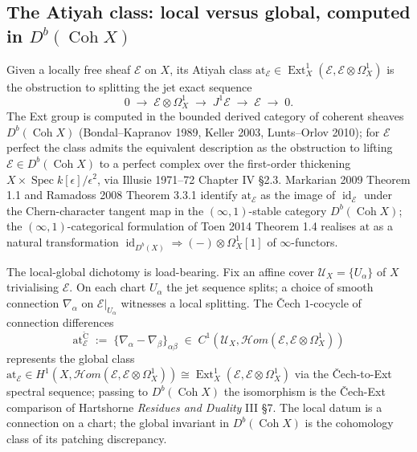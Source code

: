 \documentclass[11pt,reqno]{amsart}
\theoremstyle{plain}
\theoremstyle{definition}
\theoremstyle{remark}
\DeclareMathOperator{\Ext}{Ext}
\DeclareMathOperator{\Coh}{Coh}
\DeclareMathOperator{\id}{id}
\DeclareMathOperator{\Spec}{Spec}
\newcommand{\cU}{\mathcal{U}}
\newcommand{\cE}{\mathcal{E}}
\newcommand{\at}{\mathrm{at}}
\begin{document}
\subsection{The Atiyah class: local versus global, computed in $D^b(\Coh X)$}
\label{subsec:atiyah-local-global}
Given a locally free sheaf $\cE$ on $X$, its Atiyah class $\at_\cE \in \Ext^1_X(\cE, \cE \otimes \Omega^1_X)$ is the obstruction to splitting the jet exact sequence
\[
  0 \;\longrightarrow\; \cE \otimes \Omega^1_X \;\longrightarrow\; J^1 \cE \;\longrightarrow\; \cE \;\longrightarrow\; 0.
\]
The Ext group is computed in the bounded derived category of coherent sheaves $D^b(\Coh X)$ (Bondal--Kapranov 1989, Keller 2003, Lunts--Orlov 2010); for $\cE$ perfect the class admits the equivalent description as the obstruction to lifting $\cE \in D^b(\Coh X)$ to a perfect complex over the first-order thickening $X \times \Spec k[\epsilon]/\epsilon^2$, via Illusie 1971--72 Chapter IV \S2.3. Markarian 2009 Theorem 1.1 and Ramadoss 2008 Theorem 3.3.1 identify $\at_\cE$ as the image of $\id_\cE$ under the Chern-character tangent map in the $(\infty,1)$-stable category $D^b(\Coh X)$; the $(\infty,1)$-categorical formulation of Toen 2014 Theorem 1.4 realises $\at$ as a natural transformation $\id_{D^b(X)} \Rightarrow (-) \otimes \Omega^1_X[1]$ of $\infty$-functors.

The local-global dichotomy is load-bearing. Fix an affine cover $\cU_X = \{U_\alpha\}$ of $X$ trivialising $\cE$. On each chart $U_\alpha$ the jet sequence splits; a choice of smooth connection $\nabla_\alpha$ on $\cE|_{U_\alpha}$ witnesses a local splitting. The Čech $1$-cocycle of connection differences
\[
  \at_\cE^{\check{\mathrm C}} \;:=\; \{\nabla_\alpha - \nabla_\beta\}_{\alpha\beta} \;\in\; C^1(\cU_X, \mathcal{H}om(\cE, \cE \otimes \Omega^1_X))
\]
represents the global class $\at_\cE \in H^1(X, \mathcal{H}om(\cE, \cE \otimes \Omega^1_X)) \cong \Ext^1_X(\cE, \cE \otimes \Omega^1_X)$ via the Čech-to-Ext spectral sequence; passing to $D^b(\Coh X)$ the isomorphism is the Čech-Ext comparison of Hartshorne \emph{Residues and Duality} III \S7. The local datum is a connection on a chart; the global invariant in $D^b(\Coh X)$ is the cohomology class of its patching discrepancy.
\end{document}
